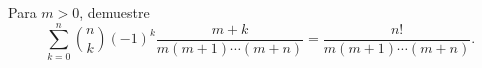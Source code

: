 Para \(m>0\), demuestre
\[\sum_{k=0}^n \binom{n}{k} (-1)^k \frac{m+k}{m(m+1)\cdots(m+n)}
  = \frac{n!}{m(m+1)\cdots(m+n)}.\]
